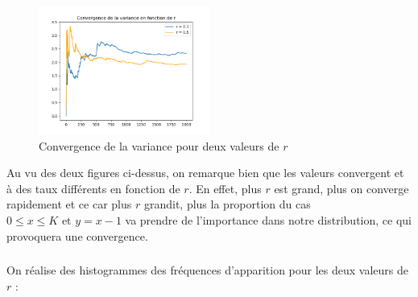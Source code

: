 \begin{figure}[H]
  \centering
  \includegraphics[width=0.5\textwidth]{figs/convergence_var.png}
  \caption{Convergence de la variance pour deux valeurs de $r$}
\end{figure}

Au vu des deux figures ci-dessus, on remarque bien que les valeurs convergent et à des taux différents en fonction de $r$. En effet, plus $r$ est grand, plus on converge rapidement et ce car 
plus $r$ grandit, plus la proportion du cas $0 \leq x \leq K \text{ et } y = x-1$ va prendre de l'importance dans notre distribution, ce qui provoquera une convergence. 

\subsubsection{}
On réalise des histogrammes des fréquences d'apparition pour les deux valeurs de $r$ :

